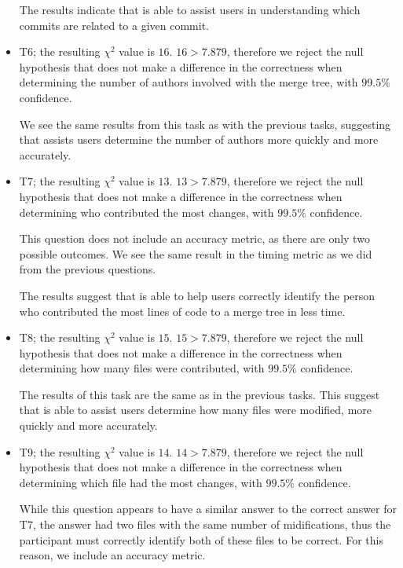 \begin{itemize}
    The results indicate that \tool is able to assist users in
    understanding which commits are related to a given commit.

  \item

    T6; the resulting $\chi^2$ value is $16$. $16 > 7.879$, therefore we
    reject the null hypothesis that \tool does not make a difference in
    the correctness when determining the number of authors involved with
    the merge tree, with $99.5\%$ confidence.

    We see the same results from this task as with the previous tasks,
    suggesting that \tool assists users determine the number of authors
    more quickly and more accurately.

  \item

    T7; the resulting $\chi^2$ value is $13$. $13 > 7.879$, therefore we
    reject the null hypothesis that \tool does not make a difference in
    the correctness when determining who contributed the most changes,
    with $99.5\%$ confidence.

    This question does not include an accuracy metric, as there are only
    two possible outcomes. We see the same result in the timing metric
    as we did from the previous questions.

    The results suggest that \tool is able to help users correctly
    identify the person who contributed the most lines of code to a
    merge tree in less time.

  \item

    T8; the resulting $\chi^2$ value is $15$. $15 > 7.879$, therefore we
    reject the null hypothesis that \tool does not make a difference in
    the correctness when determining how many files were contributed,
    with $99.5\%$ confidence.

    The results of this task are the same as in the previous tasks.
    This suggest that \tool is able to assist users determine how many
    files were modified, more quickly and more accurately.

  \item

    T9; the resulting $\chi^2$ value is $14$. $14 > 7.879$, therefore we
    reject the null hypothesis that \tool does not make a difference in
    the correctness when determining which file had the most changes,
    with $99.5\%$ confidence.

    While this question appears to have a similar answer to the correct
    answer for T7, the answer \comA had two files with the same number
    of midifications, thus the participant must correctly identify both
    of these files to be correct. For this reason, we include an
    accuracy metric.


\end{itemize}
